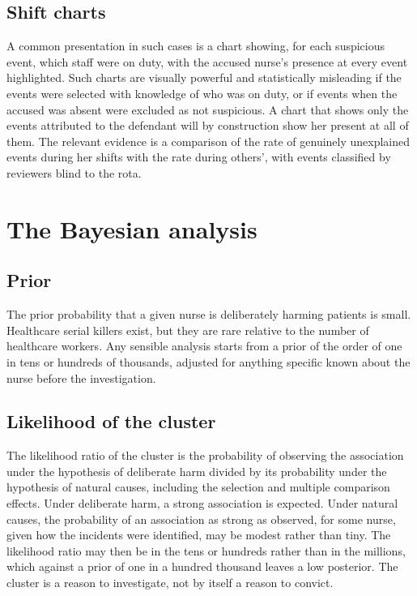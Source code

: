 \subsection{Shift charts}

A common presentation in such cases is a chart showing, for each suspicious event, which staff were on duty, with the accused nurse's presence at every event highlighted. Such charts are visually powerful and statistically misleading if the events were selected with knowledge of who was on duty, or if events when the accused was absent were excluded as not suspicious. A chart that shows only the events attributed to the defendant will by construction show her present at all of them. The relevant evidence is a comparison of the rate of genuinely unexplained events during her shifts with the rate during others', with events classified by reviewers blind to the rota.

\section{The Bayesian analysis}

\subsection{Prior}

The prior probability that a given nurse is deliberately harming patients is small. Healthcare serial killers exist, but they are rare relative to the number of healthcare workers. Any sensible analysis starts from a prior of the order of one in tens or hundreds of thousands, adjusted for anything specific known about the nurse before the investigation.

\subsection{Likelihood of the cluster}

The likelihood ratio of the cluster is the probability of observing the association under the hypothesis of deliberate harm divided by its probability under the hypothesis of natural causes, including the selection and multiple comparison effects. Under deliberate harm, a strong association is expected. Under natural causes, the probability of an association as strong as observed, for some nurse, given how the incidents were identified, may be modest rather than tiny. The likelihood ratio may then be in the tens or hundreds rather than in the millions, which against a prior of one in a hundred thousand leaves a low posterior. The cluster is a reason to investigate, not by itself a reason to convict.

